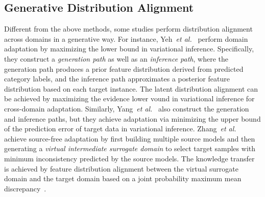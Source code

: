 \documentclass[10pt,journal,compsoc]{IEEEtran}
\def\etal{{\em et al.}}
\begin{document}
\subsection{Generative Distribution Alignment}
Different from the above methods, some studies perform distribution alignment across domains in a generative way.
For instance, Yeh~\etal~\cite{yeh2021sofa} perform domain adaptation by maximizing the lower bound in variational inference. 
Specifically, they construct a \emph{generation path} as well as an \emph{inference path}, where the generation path produces a prior feature distribution derived from predicted category labels, and the inference path approximates a posterior feature distribution based on each target instance.
The latent distribution alignment can be achieved by maximizing the evidence lower vound in variational inference for cross-domain adaptation.
Similarly, Yang~\etal~\cite{yang2021model} also construct the generation and inference paths, but they achieve adaptation via minimizing the upper bound of the prediction error of target data in variational inference.
Zhang~\etal~\cite{zhang2022lightweight} achieve source-free adaptation by first building multiple source models and then generating a \emph{virtual intermediate surrogate domain} to select target samples with minimum inconsistency predicted by the source models.
The knowledge transfer is achieved by feature distribution alignment between the virtual surrogate domain and the target domain based on a joint probability maximum mean discrepancy~\cite{zhang2020discriminative}.
\end{document}

